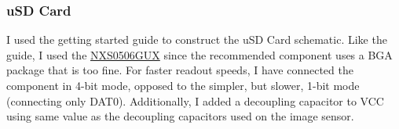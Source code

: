 \documentclass[10pt]{article}
\newcommand{\nl}{\newline \newline}
\begin{document}
\subsubsection{uSD Card}
I used the getting started guide to construct the uSD Card schematic. Like the guide, I used the \href{https://au.mouser.com/ProductDetail/Nexperia/NXS0506GUX?qs=mELouGlnn3dJ4MXFP%2FlneA%3D%3D&srsltid=AfmBOoq__LF323ZMhiJBtt4tLQK1fKdHaHOFdmzJQE47FNIF2Kj_ja8B}{NXS0506GUX} since the recommended component uses a BGA package that is too fine.
\nl
For faster readout speeds, I have connected the component in 4-bit mode, opposed to the simpler, but slower, 1-bit mode (connecting only DAT0).
\nl
Additionally, I added a decoupling capacitor to VCC using same value as the decoupling capacitors used on the image sensor.



\end{document}
